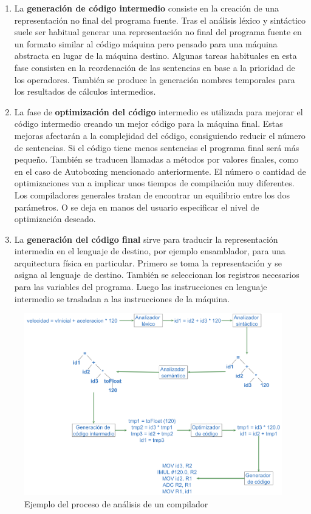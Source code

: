 \begin{enumerate}
    \item La \textbf{generación de código intermedio} consiste en la creación de una representación no final del programa fuente. Tras el análisis léxico y sintáctico suele ser habitual generar una representación no final del programa fuente en un formato similar al código máquina pero pensado para una máquina abstracta en lugar de la máquina destino. Algunas tareas habituales en esta fase consisten en la reordenación de las sentencias en base a la prioridad de los operadores. También se produce la generación nombres temporales para los resultados de cálculos intermedios.
    
    \item La fase de \textbf{optimización del código} intermedio es utilizada para mejorar el código intermedio creando un mejor código para la máquina final. Estas mejoras afectarán a la complejidad del código, consiguiendo reducir el número de sentencias. Si el código tiene menos sentencias el programa final será más pequeño. También se traducen llamadas a métodos por valores finales, como en el caso de Autoboxing mencionado anteriormente. El número o cantidad de optimizaciones van a implicar unos tiempos de compilación muy diferentes. Los compiladores generales tratan de encontrar un equilibrio entre los dos parámetros. O se deja en manos del usuario especificar el nivel de optimización deseado.
    
    \item La \textbf{generación del código final} sirve para traducir la representación intermedia en el lenguaje de destino, por ejemplo ensamblador, para una arquitectura física en particular. Primero se toma la representación y se asigna al lenguaje de destino. También se seleccionan los registros necesarios para las variables del programa. Luego las instrucciones en lenguaje intermedio se trasladan a las instrucciones de la máquina.

\end{enumerate}

\begin{figure}[hp!]
    \centering
    \includegraphics[width=1.0\textwidth]{imaxes/c-bases-teoricas/analisis-lexico-sintactico.png}
    \caption{Ejemplo del proceso de análisis de un compilador}
    \label{fig:analisis-lexico-sintáctico}
\end{figure}
